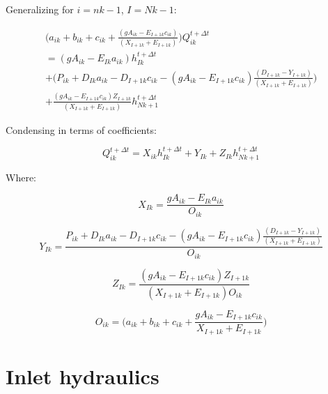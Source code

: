 \documentclass[11pt]{article}
\begin{document}
Generalizing for $i = nk - 1$, $I = Nk - 1$:

\begin{equation}
  \begin{split}
    \biggl(a_{ik} + b_{ik} + c_{ik} + \frac{( g A_{ik} - E_{I + 1k} c_{ik} )}{(X_{I + 1k} + E_{I + 1k})} \biggr)  Q_{ik}^{t + \Delta t} \\ = ( g A_{ik} - E_{Ik} a_{ik}) h_{Ik}^{t + \Delta t} \\ + \biggl( P_{ik} + D_{Ik} a_{ik}   - D_{I + 1k} c_{ik} - ( g A_{ik} - E_{I + 1k} c_{ik} ) \frac{( D_{I + 1k} - Y_{I + 1k})}{(X_{I + 1k} + E_{I + 1k})} \biggr) \\ + \frac{( g A_{ik} - E_{I + 1k} c_{ik} ) Z_{I + 1k}}{(X_{I + 1k} + E_{I + 1k})} h_{Nk + 1}^{t + \Delta t}
  \end{split}
\end{equation}

Condensing in terms of coefficients:

\begin{equation}
  \boxed{
 Q_{ik}^{t + \Delta t} = X_{ik} h_{Ik}^{t + \Delta t} + Y_{Ik} + Z_{Ik} h_{Nk + 1}^{t + \Delta t} 
 }
\end{equation}

Where:

\begin{equation}
  \boxed{
    X_{Ik} = \frac{ g A_{ik} - E_{Ik} a_{ik}}{O_{ik}}
 }
\end{equation}

\begin{equation}
  \boxed{
    Y_{Ik} = \frac{P_{ik} + D_{Ik} a_{ik}   - D_{I + 1k} c_{ik} - ( g A_{ik} - E_{I + 1k} c_{ik} ) \frac{( D_{I + 1k} - Y_{I + 1k})}{(X_{I + 1k} + E_{I + 1k})}}{O_{ik}}
 }
\end{equation}

\begin{equation}
  \boxed{
    Z_{Ik} = \frac{( g A_{ik} - E_{I + 1k} c_{ik} ) Z_{I + 1k}}{(X_{I + 1k} + E_{I + 1k}) O_{ik}}
 }
\end{equation}

\begin{equation}
  \boxed{
 O_{ik} = \biggl(a_{ik} + b_{ik} + c_{ik} + \frac{ g A_{ik} - E_{I + 1k} c_{ik} }{X_{I + 1k} + E_{I + 1k}} \biggr) 
 }
\end{equation}

\clearpage

\section*{Inlet hydraulics}
\end{document}
